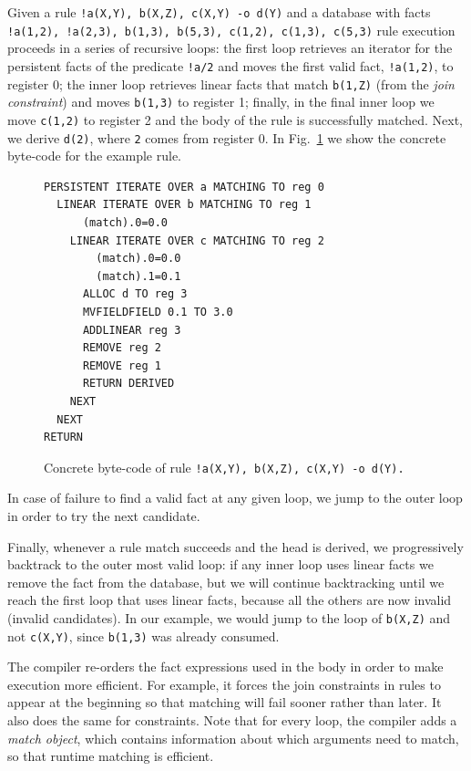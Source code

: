 Given a rule \texttt{!a(X,Y), b(X,Z), c(X,Y) -o d(Y)} and a database with facts
\texttt{!a(1,2), !a(2,3), b(1,3), b(5,3), c(1,2), c(1,3), c(5,3)} rule execution proceeds
in a series of recursive loops: the first loop retrieves an iterator for the persistent facts
of the predicate \texttt{!a/2} and moves the first valid fact, \texttt{!a(1,2)},
to register 0; the inner loop retrieves linear facts that match \texttt{b(1,Z)} (from the
\emph{join constraint}) and moves \texttt{b(1,3)} to register 1; finally, in the final inner
loop we move \texttt{c(1,2)} to register 2 and the body of the rule is successfully matched. Next, we
derive \texttt{d(2)}, where \texttt{2} comes from register 0.
In Fig.~\ref{fig:byte_code} we show the concrete byte-code for the example rule.

\begin{figure}[h]
\scriptsize\begin{Verbatim}
PERSISTENT ITERATE OVER a MATCHING TO reg 0
  LINEAR ITERATE OVER b MATCHING TO reg 1
      (match).0=0.0
    LINEAR ITERATE OVER c MATCHING TO reg 2
        (match).0=0.0
        (match).1=0.1
      ALLOC d TO reg 3
      MVFIELDFIELD 0.1 TO 3.0
      ADDLINEAR reg 3
      REMOVE reg 2
      REMOVE reg 1
      RETURN DERIVED
    NEXT
  NEXT
RETURN
\end{Verbatim}
\caption{Concrete byte-code of rule \texttt{!a(X,Y), b(X,Z), c(X,Y) -o d(Y).}}
\label{fig:byte_code}
\end{figure}

In case of failure to find a valid fact at any given loop, we jump
to the outer loop in order to try the next candidate.

Finally, whenever a rule match succeeds and the head is derived, we progressively backtrack to the outer most valid loop:
if any inner loop uses linear facts we remove the fact from the database, but we will
continue backtracking until we reach the first loop that uses linear facts,
because all the others are now invalid (invalid candidates). In our example, we would jump to the
loop of \texttt{b(X,Z)} and not \texttt{c(X,Y)}, since \texttt{b(1,3)} was already consumed.

The compiler re-orders the fact expressions used in the body in order to make execution more
efficient. For example, it forces the join constraints in rules to appear at the beginning so
that matching will fail sooner rather than later. It also does the same for constraints.
Note that for every loop, the compiler adds a \emph{match object}, which contains information
about which arguments need to match, so that runtime matching is efficient.

